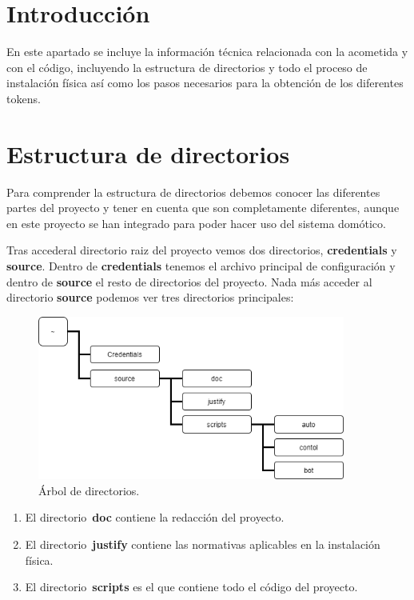 
\section{Introducción}
En este apartado se incluye la información técnica relacionada con la acometida y con el código, incluyendo la estructura de directorios y todo el proceso de instalación física así como los pasos necesarios para la obtención de los diferentes tokens.

\section{Estructura de directorios}
Para comprender la estructura de directorios debemos conocer las diferentes partes del proyecto y tener en cuenta que son completamente diferentes, aunque en este proyecto se han integrado para poder hacer uso del sistema domótico. 

Tras accederal directorio raiz del proyecto vemos dos directorios, \textbf{credentials} y \textbf{source}. Dentro de \textbf{credentials} tenemos el archivo principal de configuración y dentro de \textbf{source} el resto de directorios del proyecto. Nada más acceder al directorio \textbf{source} podemos ver tres directorios principales:

\begin{figure}[h]
\centering
\includegraphics[width=0.9\textwidth]{img/Diagramas/directorios1.png}
\caption{Árbol de directorios.}\label{Directorios}
\end{figure}

\begin{enumerate}
    \item El directorio~\textbf{doc} contiene la redacción del proyecto.
    \item El directorio~\textbf{justify} contiene las normativas aplicables en la instalación física.
    \item El directorio~\textbf{scripts} es el que contiene todo el código del proyecto.
\end{enumerate}


